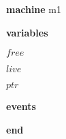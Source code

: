 \begin{block}
  \item   \textbf{machine} m1
  \item   \textbf{variables}
  \begin{block}
    \item   $free$
    \item   $live$
    \item   $ptr$
  \end{block}
  \item   
  \item   
  \item   \textbf{events}
  \begin{block}
    \item   
    \item   
    \item   
    \item   
  \end{block}
  \item   \textbf{end} \\
\end{block}
